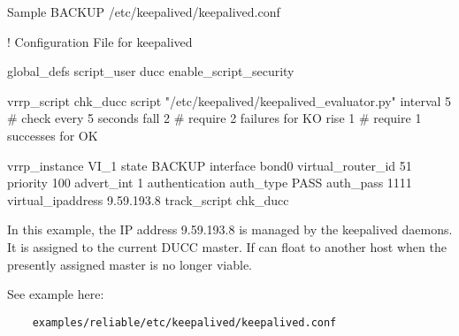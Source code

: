 \begin{minipage}{\textwidth}

	Sample BACKUP /etc/keepalived/keepalived.conf\\
	
	\begin{greybatim}
	
! Configuration File for keepalived

global_defs {
	script_user ducc 
	enable_script_security
}

vrrp_script chk_ducc {
  script       "/etc/keepalived/keepalived_evaluator.py"
  interval 5   # check every 5 seconds
  fall 2       # require 2 failures for KO
  rise 1       # require 1 successes for OK
}

vrrp_instance VI_1 {
    state BACKUP
    interface bond0
    virtual_router_id 51
    priority 100
    advert_int 1
    authentication {
        auth_type PASS
        auth_pass 1111
    }
    virtual_ipaddress {
        9.59.193.8
    }
    track_script {
    	chk_ducc
  	}
}

   	\end{greybatim}
   	
\end{minipage}

	\medskip
	In this example, the IP address 9.59.193.8 is managed by the keepalived daemons.
   	It is assigned to the current DUCC master.
   	If can float to another host when the presently assigned master is no longer viable.

	\medskip
	See example here:
	\begin{verbatim}
    examples/reliable/etc/keepalived/keepalived.conf
   	\end{verbatim}

